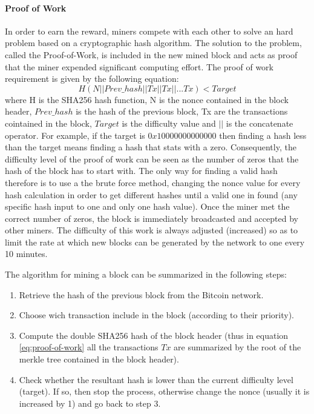 \paragraph{Proof of Work} In order to earn the reward, miners compete with each
other to solve an hard problem based on a cryptographic hash algorithm. The
solution to the problem, called the Proof-of-Work, is included in the new mined
block and acts as proof that the miner expended significant computing effort.
The proof of work requirement is given by the following equation:
\begin{equation}\label{eq:proof-of-work}
  H ( N || Prev\_hash || Tx || Tx || . . . Tx) < Target
\end{equation} where H is the SHA256 hash function, N is the nonce
contained in the block header, $Prev\_hash$ is the hash of the previous block,
Tx are the transactions cointained in the block, $Target$ is the difficulty
value and $||$ is the concatenate operator.
For example, if the target is $0x10000000000000$ then finding a hash less than
the target means finding a hash that stats with a zero. Consequently, the
difficulty level of the proof of work can be seen as the number of zeros that the
hash of the block has to start with. The only way for finding a valid hash therefore
is to use a the brute force method, changing the nonce value for every hash
calculation in order to get different hashes until a valid one in found
(any specific hash input to one and only one hash value).
Once the miner met the correct number of zeros, the block is immediately
broadcasted and accepted by other miners.
The difficulty of this work is always adjusted (increased) so as to limit the
rate at which new blocks can be generated by the network to one every 10 minutes.

The algorithm for mining a block can be summarized in the following steps:
\begin{enumerate}
  \item Retrieve the hash of the previous block from the Bitcoin network.
  \item Choose wich transaction include in the block (according to their priority).
  \item Compute the double SHA256 hash of the block header (thus in equation
  \ref{eq:proof-of-work} all the transactions $Tx$ are summarized by the root
  of the merkle tree contained in the block header).
  \item Check whether the resultant hash is lower than the current difficulty level
  (target). If so, then stop the process, otherwise change the nonce (usually it is
  increased by 1) and go back to step 3.
\end{enumerate}
















